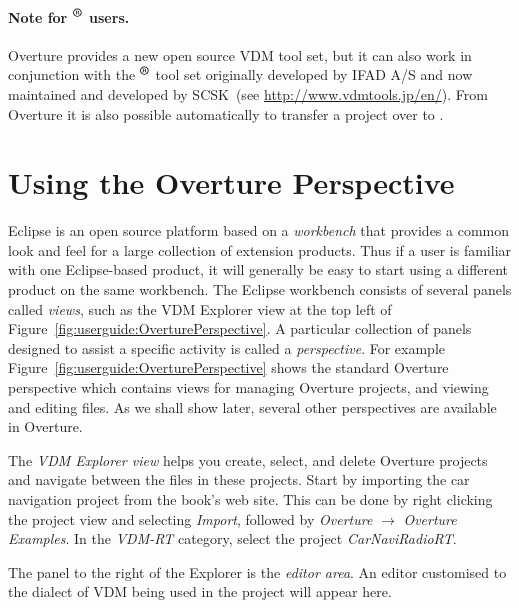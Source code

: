 \paragraph{Note for \vdmtools$^{\mbox{\small\textbf{{\textregistered}}}}$ users.} 
Overture provides a new open source VDM tool set, but it can also work
in conjunction with the
\vdmtools$^{\mbox{\small\textbf{{\textregistered}}}}$
tool set originally developed by IFAD A/S and now maintained and
developed by SCSK~(see
\url{http://www.vdmtools.jp/en/}). From Overture it is also possible
automatically to transfer a project over to \vdmtools.
 
\section{Using the Overture Perspective}\label{sec:vdmsupport}

Eclipse is an open source platform based on a \emph{workbench} that
provides a common look and feel for a large collection of extension
products. Thus if a user is familiar with one Eclipse-based product,
it will generally be easy to start using a different product on the
same workbench. The Eclipse workbench consists of several panels
called \emph{views}, such as the VDM Explorer view at the top left
of Figure~\ref{fig:userguide:OverturePerspective}. A particular
collection of panels designed to assist a specific activity is called a
\emph{perspective}. For example
Figure~\ref{fig:userguide:OverturePerspective} shows the standard
Overture perspective which contains views for managing Overture
projects, and viewing and editing files. As we shall show later,
several other perspectives are available in Overture.

The \emph{VDM Explorer view} helps you create, select, and delete
Overture projects and navigate between the files in these
projects. Start by importing the car navigation project from the
book's web site. This can be done by right clicking the project view
and selecting \emph{Import}, followed by \emph{Overture} $\rightarrow$
\emph{Overture Examples}.  In the \emph{VDM-RT} category, select the project \emph{CarNaviRadioRT}.

The panel to the right of the Explorer is the \emph{editor area}. An
editor customised to the dialect of VDM being used in the project will
appear here.

